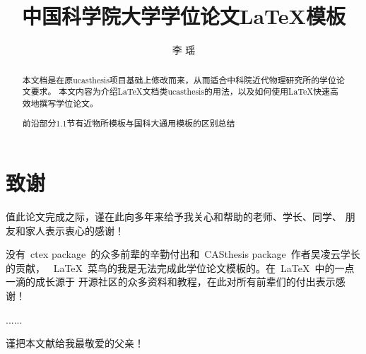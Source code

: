   \confidential{}%
  \title[国科大\LaTeX{}模板]{中国科学院大学学位论文\LaTeX{}模板}%
  \author{李 瑶}%
\maketitle
\makeenglishtitle
\makedeclaration

\chapter{致\quad 谢}

\quad \quad 值此论文完成之际，谨在此向多年来给予我关心和帮助的老师、学长、同学、
朋友和家人表示衷心的感谢！

没有~ctex package~的众多前辈的辛勤付出和~CASthesis package~作者吴凌云学长的贡献，
~\LaTeX{}~菜鸟的我是无法完成此学位论文模板的。在~\LaTeX{}~中的一点一滴的成长源于
开源社区的众多资料和教程，在此对所有前辈们的付出表示感谢！

......

谨把本文献给我最敬爱的父亲！
\begin{abstract}%
\quad \quad 本文档是在原ucasthesis项目基础上修改而来，从而适合中科院近代物理研究所的学位论文要求。
本文内容为介绍\LaTeX{}文档类ucasthesis的用法，以及如何使用\LaTeX{}快速高效地撰写学位论文。

{\color{red} 前沿部分1.1节有近物所模板与国科大通用模板的区别总结}

\end{abstract}

